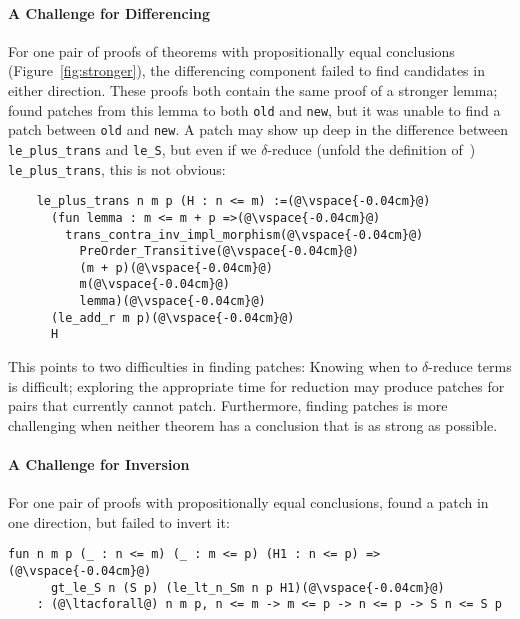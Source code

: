 \paragraph{A Challenge for Differencing} For one pair of proofs of theorems 
with propositionally equal conclusions (Figure~\ref{fig:stronger}),
the differencing component failed to find candidates in either direction.
These proofs both contain the same proof of a stronger lemma;
\sysname found patches from this lemma to
both \lstinline{old} and \lstinline{new},
but it was unable to find a patch between \lstinline{old} and \lstinline{new}.
A patch may show up deep in the difference between \lstinline{le_plus_trans}
and \lstinline{le_S}, but even if we $\delta$-reduce (unfold the definition of~\cite{equality}) \lstinline{le_plus_trans}, this is not obvious:

\begin{lstlisting}
    le_plus_trans n m p (H : n <= m) :=(@\vspace{-0.04cm}@)
      (fun lemma : m <= m + p =>(@\vspace{-0.04cm}@)
        trans_contra_inv_impl_morphism(@\vspace{-0.04cm}@)
          PreOrder_Transitive(@\vspace{-0.04cm}@)
          (m + p)(@\vspace{-0.04cm}@)
          m(@\vspace{-0.04cm}@)
          lemma)(@\vspace{-0.04cm}@)
      (le_add_r m p)(@\vspace{-0.04cm}@)
      H
\end{lstlisting}

This points to two difficulties in finding patches: Knowing when to $\delta$-reduce terms 
is difficult; exploring the appropriate time for reduction
may produce patches for pairs that \sysname currently cannot patch.
Furthermore, finding patches is more challenging
when neither theorem has a conclusion that is as strong as possible.

\paragraph{A Challenge for Inversion} For one pair of proofs with propositionally equal conclusions,
\sysname found a patch in one direction, but failed to invert it:

\begin{lstlisting}[language=coq]
    fun n m p (_ : n <= m) (_ : m <= p) (H1 : n <= p) =>(@\vspace{-0.04cm}@)
      gt_le_S n (S p) (le_lt_n_Sm n p H1)(@\vspace{-0.04cm}@)
    : (@\ltacforall@) n m p, n <= m -> m <= p -> n <= p -> S n <= S p
\end{lstlisting}

